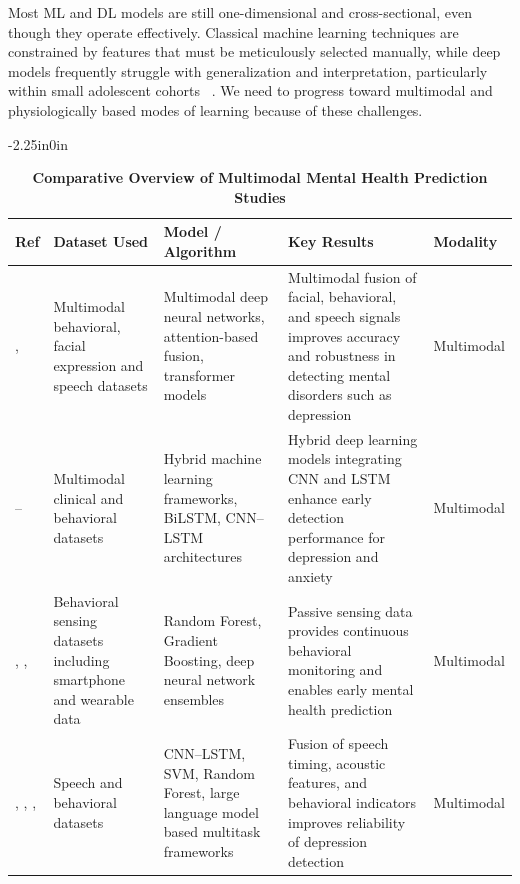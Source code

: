 \documentclass[10pt,letterpaper]{article}
\begin{document}
Most ML and DL models are still one-dimensional and cross-sectional, even though they operate effectively. Classical machine learning techniques are constrained by features that must be meticulously selected manually, while deep models frequently struggle with generalization and interpretation, particularly within small adolescent cohorts ~\cite{ref15,ref16}. We need to progress toward multimodal and physiologically based modes of learning because of these challenges.

\begin{table}[!t]
\begin{adjustwidth}{-2.25in}{0in}
\centering
\caption{\textbf{Comparative Overview of Multimodal Mental Health Prediction Studies}}
\label{tab:multimodal_comparison}
\footnotesize
\renewcommand{\arraystretch}{1.15}

\begin{tabular}{|p{2.0cm}|p{3.5cm}|p{3.8cm}|p{4.8cm}|p{1.8cm}|}
\hline
\textbf{Ref} & \textbf{Dataset Used} & \textbf{Model / Algorithm} & \textbf{Key Results} & \textbf{Modality} \\
\hline

\cite{ref1},\cite{ref4}
& Multimodal behavioral, facial expression and speech datasets
& Multimodal deep neural networks, attention-based fusion, transformer models
& Multimodal fusion of facial, behavioral, and speech signals improves accuracy and robustness in detecting mental disorders such as depression
& Multimodal \\
\hline

\cite{ref5}--\cite{ref8}
& Multimodal clinical and behavioral datasets
& Hybrid machine learning frameworks, BiLSTM, CNN--LSTM architectures
& Hybrid deep learning models integrating CNN and LSTM enhance early detection performance for depression and anxiety
& Multimodal \\
\hline

\cite{ref9}, \cite{ref12}, \cite{ref26}
& Behavioral sensing datasets including smartphone and wearable data
& Random Forest, Gradient Boosting, deep neural network ensembles
& Passive sensing data provides continuous behavioral monitoring and enables early mental health prediction
& Multimodal \\
\hline

\cite{ref10}, \cite{ref14}, \cite{ref20}, \cite{ref27}
& Speech and behavioral datasets
& CNN--LSTM, SVM, Random Forest, large language model based multitask frameworks
& Fusion of speech timing, acoustic features, and behavioral indicators improves reliability of depression detection
& Multimodal \\
\hline


\end{tabular}
\end{adjustwidth}
\end{table}
\end{document}
